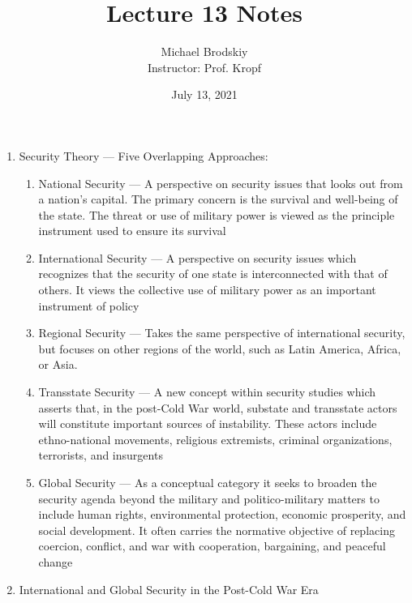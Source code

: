 \documentclass[12pt]{article}
\title{Lecture 13 Notes}
\date{July 13, 2021}
\author{Michael Brodskiy\\ \small Instructor: Prof. Kropf}
\begin{document}
    \maketitle

    \begin{enumerate}

      \item Security Theory — Five Overlapping Approaches:

        \begin{enumerate}

          \item National Security — A perspective on security issues that looks out from a nation’s capital. The primary concern is the survival and well-being of the state. The threat or use of military power is viewed as the principle instrument used to ensure its survival

          \item International Security — A perspective on security issues which recognizes that the security of one state is interconnected with that of others. It views the collective use of military power as an important instrument of policy

          \item Regional Security — Takes the same perspective of international security, but focuses on other regions of the world, such as Latin America, Africa, or Asia. 

          \item Transstate Security — A new concept within security studies which asserts that, in the post-Cold War world, substate and transstate actors will constitute important sources of instability. These actors include ethno-national movements, religious extremists, criminal organizations, terrorists, and insurgents 

          \item Global Security — As a conceptual category it seeks to broaden the security agenda beyond the military and politico-military matters to include human rights, environmental protection, economic prosperity, and social development. It often carries the normative objective of replacing coercion, conflict, and war with cooperation, bargaining, and peaceful change

        \end{enumerate}

      \item International and Global Security in the Post-Cold War Era


\end{enumerate}
\end{document}
